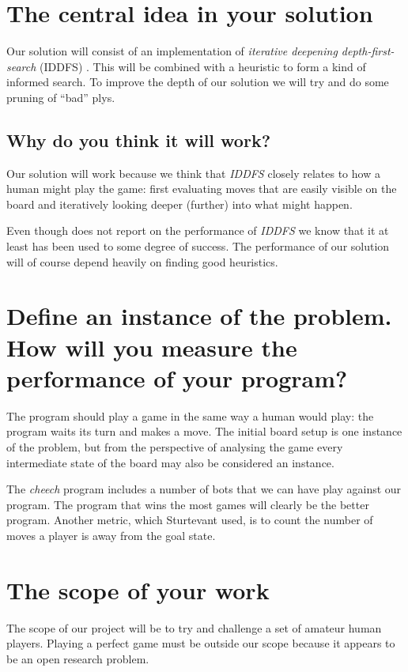 \documentclass[a4paper,11pt]{report}
\begin{document}
\section{The central idea in your solution}
Our solution will consist of an implementation of \emph{iterative
  deepening depth-first-search} (IDDFS) \cite{aimodern}. This will be
combined with a heuristic to form a kind of informed search. To
improve the depth of our solution we will try and do some pruning of
``bad'' plys.%

\subsection{Why do you think it will work?}
Our solution will work because we think that \emph{IDDFS} closely
relates to how a human might play the game: first evaluating
moves that are easily visible on the board and iteratively looking
deeper (further) into what might happen.

Even though \cite{Huang:2001:SGP:378593.378708} does not report on the
performance of \emph{IDDFS} we know that it at least has been used to
some degree of success. The performance of our solution will of course
depend heavily on finding good heuristics.

\section{Define an instance of the problem. How will you measure the performance of your program?} 

The program should play a game in the same way a human would play: the
program waits its turn and makes a move. The initial board setup is
one instance of the problem, but from the perspective of analysing the
game every intermediate state of the board may also be considered an
instance.

The \emph{cheech} program includes a number of bots that we can have
play against our program. The program that wins the most games will
clearly be the better program. Another metric, which Sturtevant used,
is to count the number of moves a player is away from the goal state.

\section{The scope of your work} 
The scope of our project will be to try and challenge a set of amateur
human players. Playing a perfect game must be outside our scope
because it appears to be an open research problem.
\end{document}
